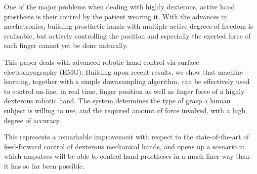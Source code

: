 One of the major problems when dealing with highly dexterous, active
hand prosthesis is their control by the patient wearing it. With the
advances in mechatronics, building prosthetic hands with multiple
active degrees of freedom is realisable, but actively controlling the
position and especially the exerted force of each finger cannot yet
be done naturally.

This paper deals with advanced robotic hand control via surface
electromyography (EMG). Building upon recent results, we show that
machine learning, together with a simple downsampling algorithm, can
be effectively used to control on-line, in real time, finger position
as well as finger force of a highly dexterous robotic hand. The system
determines the type of grasp a human subject is willing to use, and
the required amount of force involved, with a high degree of accuracy.

This represents a remarkable improvement with respect to the
state-of-the-art of feed-forward control of dexterous mechanical
hands, and opens up a scenario in which amputees will be able to
control hand prostheses in a much finer way than it has so far been
possible.
